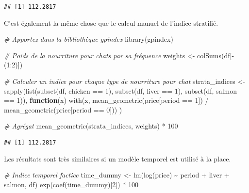 \documentclass[
]{article}
\newenvironment{Shaded}{\begin{snugshade}}{\end{snugshade}}
\newcommand{\CommentTok}[1]{\textcolor[rgb]{0.56,0.35,0.01}{\textit{#1}}}
\newcommand{\ControlFlowTok}[1]{\textcolor[rgb]{0.13,0.29,0.53}{\textbf{#1}}}
\newcommand{\DecValTok}[1]{\textcolor[rgb]{0.00,0.00,0.81}{#1}}
\newcommand{\FunctionTok}[1]{\textcolor[rgb]{0.00,0.00,0.00}{#1}}
\newcommand{\NormalTok}[1]{#1}
\newcommand{\OtherTok}[1]{\textcolor[rgb]{0.56,0.35,0.01}{#1}}
\newcommand{\SpecialCharTok}[1]{\textcolor[rgb]{0.00,0.00,0.00}{#1}}
\begin{document}
\begin{verbatim}
## [1] 112.2817
\end{verbatim}

C'est également la même chose que le calcul manuel de l'indice stratifié.

\begin{Shaded}
\begin{Highlighting}[]
\CommentTok{\# Apportez dans la bibliothèque gpindex}
\FunctionTok{library}\NormalTok{(gpindex)}

\CommentTok{\# Poids de la nourriture pour chats par sa fréquence}
\NormalTok{weights }\OtherTok{\textless{}{-}} \FunctionTok{colSums}\NormalTok{(df[}\SpecialCharTok{{-}}\NormalTok{(}\DecValTok{1}\SpecialCharTok{:}\DecValTok{2}\NormalTok{)])}

\CommentTok{\# Calculer un indice pour chaque type de nourriture pour chat}
\NormalTok{strata\_indices }\OtherTok{\textless{}{-}} 
  \FunctionTok{sapply}\NormalTok{(}\FunctionTok{list}\NormalTok{(}\FunctionTok{subset}\NormalTok{(df, chicken }\SpecialCharTok{==} \DecValTok{1}\NormalTok{), }
              \FunctionTok{subset}\NormalTok{(df, liver }\SpecialCharTok{==} \DecValTok{1}\NormalTok{), }
              \FunctionTok{subset}\NormalTok{(df, salmon }\SpecialCharTok{==} \DecValTok{1}\NormalTok{)),}
         \ControlFlowTok{function}\NormalTok{(x) }\FunctionTok{with}\NormalTok{(x, }\FunctionTok{mean\_geometric}\NormalTok{(price[period }\SpecialCharTok{==} \DecValTok{1}\NormalTok{]) }\SpecialCharTok{/} \FunctionTok{mean\_geometric}\NormalTok{(price[period }\SpecialCharTok{==} \DecValTok{0}\NormalTok{]))}
\NormalTok{         )}

\CommentTok{\# Agrégat}
\FunctionTok{mean\_geometric}\NormalTok{(strata\_indices, weights) }\SpecialCharTok{*} \DecValTok{100}
\end{Highlighting}
\end{Shaded}

\begin{verbatim}
## [1] 112.2817
\end{verbatim}

Les résultats sont très similaires si un modèle temporel est utilisé à la place.

\begin{Shaded}
\begin{Highlighting}[]
\CommentTok{\# Indice temporel factice}
\NormalTok{time\_dummy }\OtherTok{\textless{}{-}} \FunctionTok{lm}\NormalTok{(}\FunctionTok{log}\NormalTok{(price) }\SpecialCharTok{\textasciitilde{}}\NormalTok{ period }\SpecialCharTok{+}\NormalTok{ liver }\SpecialCharTok{+}\NormalTok{ salmon, df)}
\FunctionTok{exp}\NormalTok{(}\FunctionTok{coef}\NormalTok{(time\_dummy)[}\DecValTok{2}\NormalTok{]) }\SpecialCharTok{*} \DecValTok{100}
\end{Highlighting}
\end{Shaded}
\end{document}
